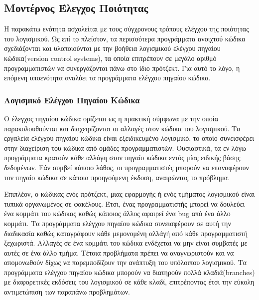 \documentclass[a4paper, 11pt]{article}
\begin{document}
{{%

\subsection{Μοντέρνος Έλεγχος Ποιότητας}

Η παρακάτω ενότητα ασχολείται με τους σύγχρονους τρόπους ελέγχου της ποιότητας του λογισμικού. Ως επί το πλείστον, τα περισσότερα προγράμματα ανοιχτού κώδικα σχεδιάζονται και υλοποιούνται με την βοήθεια λογισμικού ελέγχου πηγαίου κώδικα(\textlatin{version control systems}), τα οποία επιτρέπουν σε μεγάλο αριθμό προγραμματιστών να συνεργάζονται πάνω στο ίδιο πρότζεκτ. Για αυτό το λόγο, η επόμενη υποενότητα αναλύει τα προγράμματα ελέγχου πηγαίου κώδικα.

\subsubsection{Λογισμικό Ελέγχου Πηγαίου Κώδικα}

Ο έλεγχος πηγαίου κώδικα ορίζεται ως η πρακτική σύμφωνα με την οποία παρακολουθούνται και διαχειρίζονται οι αλλαγές στον κώδικα του λογισμικού. Τα εργαλεία ελέγχου πηγαίου κώδικα είναι εξειδικευμένο λογισμικό, το οποίο συνεισφέρει στην διαχείριση του κώδικα από ομάδες προγραμματιστών. Ουσιαστικά, τα εν λόγω προγράμματα κρατούν κάθε αλλάγη στον πηγαίο κώδικα εντός μίας ειδικής βάσης δεδομένων. Εάν συμβεί κάποιο λάθος, οι προγραμματιστές μπορούν να επαναφέρουν τον πηγαίο κώδικα σε κάποια προηγούμενη έκδοση, αναιρώντας το πρόβλημα.

Επιπλέον, ο κώδικας ενός πρότζεκτ, μιας εφαρμογής ή ενός τμήματος λογισμικού είναι τυπικά οργανωμένος σε φακέλους. Έτσι, ένας προγραμματιστής μπορεί να δουλεύει ένα κομμάτι του κώδικας καθώς κάποιος άλλος αφαιρεί ένα \textlatin{bug} από ένα άλλο κομμάτι. Τα προγράμματα ελέγχου πηγαίου κώδικα συνεισφέρουν σε αυτή την διαδικασία καθώς καταγράφουν κάθε μεμονομένη αλλάγή από κάθε προγραμματιστή ξεχωριστά. Αλλαγές σε ένα κομμάτι του κώδικα ενδέχεται να μην είναι συμβατές με αυτές σε ένα άλλο τμήμα. Τέτοια προβλήματα πρέπει να αναγνωριστούν και να απομονωθούν δίχως να παρεμποδίζουν την ανάπτυξη του υπόλοιπου λογισμικού. Τα προγράμματα ελέγχου πηγαίου κώδικα μπορούν να διατηρούν πολλά κλαδιά(\textlatin{branches}) με διαφορετικές εκδόσεις του λογισμικού σε κάθε κλαδί, επιτρέποντας έτσι την εύκολη αντιμετώπιση των παραπάνω προβλημάτων.

}}
\end{document}
